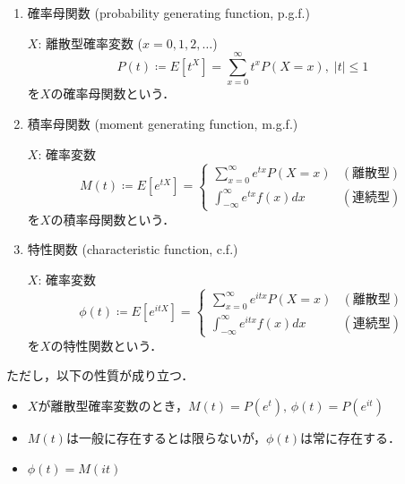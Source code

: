 \documentclass{jsreport}
\begin{document}
\begin{enumerate}
  \item 確率母関数 (probability generating function, p.g.f.)

  $X$: 離散型確率変数 ($x = 0, 1, 2, \ldots$)
  \begin{equation}
    P(t) \coloneqq E[t^X] = \sum_{x = 0}^{\infty} t^x P(X = x), \; |t| \leq 1 \nonumber
  \end{equation}
  を$X$の確率母関数という．
  \item 積率母関数 (moment generating function, m.g.f.)

  $X$: 確率変数
  \begin{equation}
    M(t) \coloneqq E[e^{tX}] = \begin{cases}
      \sum_{x = 0}^{\infty} e^{tx} P(X = x) & (離散型) \\
      \int_{-\infty}^{\infty} e^{tx} f(x) dx & (連続型)
  \end{cases} \nonumber
  \end{equation}
  を$X$の積率母関数という．
  \item 特性関数 (characteristic function, c.f.)

  $X$: 確率変数
  \begin{equation}
    \phi(t) \coloneqq E[e^{itX}] = \begin{cases}
      \sum_{x = 0}^{\infty} e^{itx} P(X = x) & (離散型) \\
      \int_{-\infty}^{\infty} e^{itx} f(x) dx & (連続型)
  \end{cases} \nonumber
  \end{equation}
  を$X$の特性関数という．
\end{enumerate}

ただし，以下の性質が成り立つ．
\begin{itemize}
  \item $X$が離散型確率変数のとき，$M(t) = P(e^t), \, \phi(t) = P(e^{it})$
  \item $M(t)$は一般に存在するとは限らないが，$\phi(t)$は常に存在する．
  \item $\phi(t) = M(it)$
\end{itemize}
\end{document}
